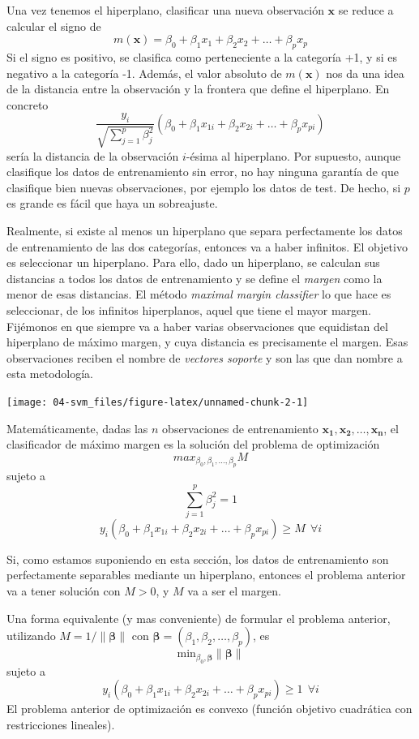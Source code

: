 \documentclass[
  spanish,
]{book}
\theoremstyle{break}
\theoremstyle{definition}
\theoremstyle{definition}
\theoremstyle{definition}
\theoremstyle{remark}
\begin{document}
Una vez tenemos el hiperplano, clasificar una nueva observación \(\mathbf{x}\) se reduce a calcular el signo de
\[m(\mathbf{x}) = \beta_0 + \beta_1 x_1 + \beta_2 x_2 + \ldots + \beta_p x_p\]
Si el signo es positivo, se clasifica como perteneciente a la categoría +1, y si es negativo a la categoría -1. Además, el valor absoluto de \(m(\mathbf{x})\) nos da una idea de la distancia entre la observación y la frontera que define el hiperplano. En concreto
\[\frac{y_i}{\sqrt {\sum_{j=1}^p \beta_j^2}}(\beta_0 + \beta_1 x_{1i} + \beta_2 x_{2i} + \ldots + \beta_p x_{pi})\]
sería la distancia de la observación \(i\)-ésima al hiperplano.
Por supuesto, aunque clasifique los datos de entrenamiento sin error, no hay ninguna garantía de que clasifique bien nuevas observaciones, por ejemplo los datos de test. De hecho, si \(p\) es grande es fácil que haya un sobreajuste.

Realmente, si existe al menos un hiperplano que separa perfectamente los datos de entrenamiento de las dos categorías, entonces va a haber infinitos. El objetivo es seleccionar un hiperplano. Para ello, dado un hiperplano, se calculan sus distancias a todos los datos de entrenamiento y se define el \emph{margen} como la menor de esas distancias. El método \emph{maximal margin classifier} lo que hace es seleccionar, de los infinitos hiperplanos, aquel que tiene el mayor margen. Fijémonos en que siempre va a haber varias observaciones que equidistan del hiperplano de máximo margen, y cuya distancia es precisamente el margen. Esas observaciones reciben el nombre de \emph{vectores soporte} y son las que dan nombre a esta metodología.

\begin{center}\texttt{[image: 04-svm\_files/figure-latex/unnamed-chunk-2-1]} \end{center}

Matemáticamente, dadas las \(n\) observaciones de entrenamiento \(\mathbf{x_1}, \mathbf{x_2}, \ldots, \mathbf{x_n}\), el clasificador de máximo margen es la solución del problema de optimización
\[max_{\beta_0, \beta_1,\ldots, \beta_p} M\]
sujeto a
\[\sum_{j=1}^p \beta_j^2 = 1\]
\[ y_i(\beta_0 + \beta_1 x_{1i} + \beta_2 x_{2i} + \ldots + \beta_p x_{pi}) \ge M \ \ \forall i\]

Si, como estamos suponiendo en esta sección, los datos de entrenamiento son perfectamente separables mediante un hiperplano, entonces el problema anterior va a tener solución con \(M>0\), y \(M\) va a ser el margen.

Una forma equivalente (y mas conveniente) de formular el problema anterior, utilizando \(M = 1/\lVert \boldsymbol{\beta} \rVert\) con \(\boldsymbol{\beta} = (\beta_1, \beta_2, \ldots, \beta_p)\), es
\[\mbox{min}_{\beta_0, \boldsymbol{\beta}} \lVert \boldsymbol{\beta} \rVert\]
sujeto a
\[ y_i(\beta_0 + \beta_1 x_{1i} + \beta_2 x_{2i} + \ldots + \beta_p x_{pi}) \ge 1 \ \ \forall i\]
El problema anterior de optimización es convexo (función objetivo cuadrática con restricciones lineales).
\end{document}
